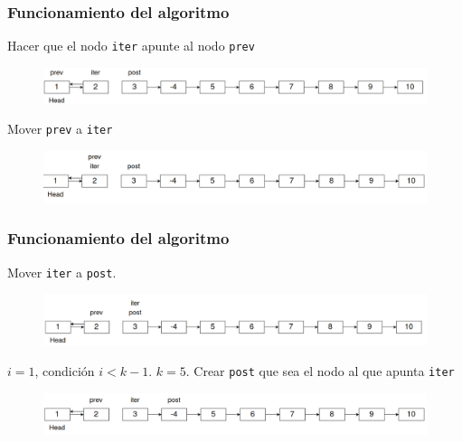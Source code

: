 \documentclass[17pt, t, lualatex]{beamer}
\newcommand{\cppinline}[1]{\lstinline[style=cppstyle]!#1!}
\begin{document}
\begin{frame}
  \frametitle{Funcionamiento del algoritmo}

  Hacer que el nodo \cppinline{iter} apunte al nodo \cppinline{prev}

  \begin{figure}[h]
    \centering
    \includegraphics[width=\textwidth]{img/fig6.png}
  \end{figure}

  Mover \cppinline{prev} a \cppinline{iter}

  \begin{figure}[h]
    \centering
    \includegraphics[width=\textwidth]{img/fig7.png}
  \end{figure}


\end{frame}

\begin{frame}
  \frametitle{Funcionamiento del algoritmo}

  Mover \cppinline{iter} a \cppinline{post}.

  \begin{figure}[h]
    \centering
    \includegraphics[width=\textwidth]{img/fig8.png}
  \end{figure}

  $i = 1$, condición $i < k-1$. $k = 5$. Crear \cppinline{post} que sea el nodo al que apunta \cppinline{iter}

  \begin{figure}[h]
    \centering
    \includegraphics[width=\textwidth]{img/fig9.png}
  \end{figure}


\end{frame}
\end{document}
